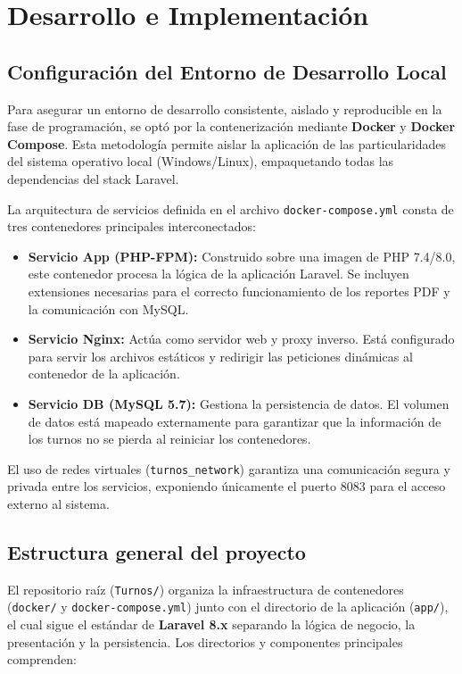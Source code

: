 \chapter{Desarrollo e Implementación}

\section{Configuración del Entorno de Desarrollo Local}
Para asegurar un entorno de desarrollo consistente, aislado y reproducible en la fase de programación, se optó por la contenerización mediante \textbf{Docker} y \textbf{Docker Compose}. Esta metodología permite aislar la aplicación de las particularidades del sistema operativo local (Windows/Linux), empaquetando todas las dependencias del stack Laravel.

La arquitectura de servicios definida en el archivo \texttt{docker-compose.yml} consta de tres contenedores principales interconectados:

\begin{itemize}
    \item \textbf{Servicio App (PHP-FPM):} Construido sobre una imagen de PHP 7.4/8.0, este contenedor procesa la lógica de la aplicación Laravel. Se incluyen extensiones necesarias para el correcto funcionamiento de los reportes PDF y la comunicación con MySQL.
    \item \textbf{Servicio Nginx:} Actúa como servidor web y proxy inverso. Está configurado para servir los archivos estáticos y redirigir las peticiones dinámicas al contenedor de la aplicación.
    \item \textbf{Servicio DB (MySQL 5.7):} Gestiona la persistencia de datos. El volumen de datos está mapeado externamente para garantizar que la información de los turnos no se pierda al reiniciar los contenedores.
\end{itemize}

El uso de redes virtuales (\texttt{turnos\_network}) garantiza una comunicación segura y privada entre los servicios, exponiendo únicamente el puerto 8083 para el acceso externo al sistema.

\section{Estructura general del proyecto}
El repositorio raíz (\texttt{Turnos/}) organiza la infraestructura de contenedores (\texttt{docker/} y \texttt{docker-compose.yml}) junto con el directorio de la aplicación (\texttt{app/}), el cual sigue el estándar de \textbf{Laravel 8.x} separando la lógica de negocio, la presentación y la persistencia. Los directorios y componentes principales comprenden:

